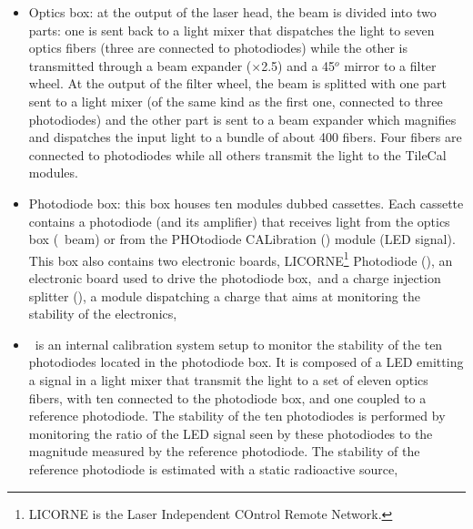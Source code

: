 \begin{itemize}
\item Optics box: at the output of the laser head, the beam is divided into two parts: one 
is sent back to a light mixer that dispatches the light to seven optics fibers (three are connected to photodiodes) while the other is transmitted through a beam expander ($\times$2.5) and a 45$^{o}$ mirror to a filter wheel. At the output of the filter wheel, the beam is splitted with one part sent to a light mixer (of the same kind as the first one, connected to three photodiodes) and the other part is sent to a beam expander which magnifies and dispatches the input light to a bundle of about 400 fibers. Four fibers are connected to photodiodes while all others transmit the light to the TileCal modules.


\item Photodiode box: this box houses ten modules dubbed cassettes. Each cassette contains a photodiode (and its amplifier) that receives light from the optics box (\laser~beam) or from the PHOtodiode CALibration (\phocal) module (LED signal). This box also contains two electronic boards, LICORNE\footnote{LICORNE is the Laser Independent COntrol Remote Network.} Photodiode (\licphd), an electronic board used to drive the photodiode box,~and a charge injection splitter (\charinjsplit), a module dispatching a charge that aims at monitoring the stability of the electronics,

\item \phocal~is an internal calibration system setup to monitor the stability of the ten photodiodes located in the photodiode box. It is composed of a LED emitting a signal in a light mixer that transmit the light to a set of eleven optics fibers, with ten connected to the photodiode box, and one coupled to a reference photodiode. 
The stability of the ten photodiodes is performed by monitoring the ratio of the LED signal seen by these photodiodes to the magnitude measured by the reference photodiode. The stability of the reference photodiode is estimated with a static radioactive source,


\end{itemize}
